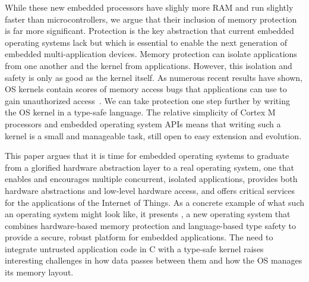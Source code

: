 While these new embedded processors have slighly more RAM and run slightly
faster than microcontrollers, we argue that their inclusion of memory 
protection is far more significant. Protection is the key abstraction that 
current embedded operating
systems lack but which is essential to enable the next generation
of embedded multi-application devices. Memory protection can isolate 
applications from one another and the kernel from applications. However,
this isolation and safety is only as good as the kernel itself. As numerous
recent results have shown, OS kernels contain scores of memory access
bugs that 
applications can use to gain unauthorized access~\cite{nickolai}. We can
take protection one step further by writing the OS kernel in a type-safe
language.  The
relative simplicity of Cortex M processors and embedded operating system
APIs means that writing such a kernel is a small and manageable task,
still open to easy extension and evolution.

This paper argues that it is time for embedded operating systems to graduate 
from  a glorified 
hardware abstraction layer to a real operating system, 
one that enables and encourages multiple concurrent, isolated applications,
provides both hardware abstractions and low-level hardware access, and offers
critical services for the applications of the Internet of Things.
As a concrete example of what such an operating system might look like,
it presents \name, a new operating system that combines hardware-based
memory protection and language-based type safety to provide a secure,
robust platform for embedded applications. The need to integrate untrusted
application code in C with a type-safe kernel raises interesting challenges
in how data passes between them and how the OS manages its memory layout.
